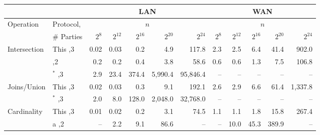 \begin{figure*}[t!]\centering\footnotesize
\begin{tabular}{|l |l|| r | r |r |r|r||r | r |r |r|r|}
	\cline{3-12}
	\multicolumn{1}{c}{}              & \multicolumn{1}{c}{}                                       & \multicolumn{5}{|c||}{LAN}                         & \multicolumn{5}{|c|}{WAN}                         \\ \hline
	\multirow{2}{*}{Operation}        & \multirow{1}{*}{Protocol,}                                 &             \multicolumn{5}{c||}{$n$}              &             \multicolumn{5}{c|}{$n$}              \\
	                                  & \# Parties                                                 & $2^8$ & $2^{12}$ & $2^{16}$ & $2^{20}$ &  $2^{24}$ & $2^8$ & $2^{12}$ & $2^{16}$ & $2^{20}$ & $2^{24}$ \\ \hline\hline
	\multirow{3}{*}{Intersection} & This                         \hfill ,3                     & 0.02  & 0.03     & 0.2      & 4.9      &     117.8 &   2.3 & 2.5      & 6.4      & 41.4     &    902.0 \\ \cline{2-12}
	                                  & \cite{CCS:KKRT16}                     \hfill ,2            & 0.2   & 0.2      & 0.4      & 3.8      &      58.6 &   0.6 & 0.6      & 1.3      & 7.5      &    106.8 \\ \cline{2-12}
	                                  & \cite{ASIACCS:BlaAgu12}$^*$                      \hfill ,3 & 2.9   & 23.4     & 374.4    & 5,990.4  &  95,846.4 &    -- & --       & --       & --       &       -- \\ \hline\hline
	\multirow{2}{*}{Joins/Union}      & This                        \hfill ,3                      & 0.02  & 0.03     & 0.3      & 9.1      &     192.1 &   2.6 & 2.9      & 6.6      & 61.4     &   1,337.8 \\ \cline{2-12}
	                                  & \cite{LTW13}$^*$                      \hfill ,3            & 2.0   & 8.0      & 128.0    & 2,048.0  &  32,768.0 &    -- & --       & --       & --       &       -- \\ \hline\hline
	\multirow{3}{*}{Cardinality}      & This                          \hfill ,3                    & 0.01  & 0.02     & 0.2      & 3.1      &      74.5 &   1.1 & 1.1      & 1.8      & 15.8     &    267.4 \\ \cline{2-12}
	                                  & \cite{PSWW18}a                          \hfill ,2          & --    & 2.2      & 9.1      & 86.6     &        -- &    -- & 10.0     & 45.3     & 389.9    &       -- \\ \cline{2-12}

\end{tabular}
\end{figure*}
